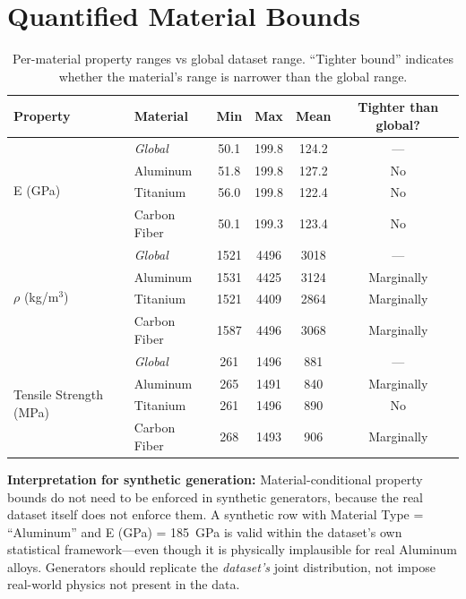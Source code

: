 \documentclass[11pt, a4paper]{report}
\begin{document}
\section{Quantified Material Bounds}

\begin{table}[H]
\centering
\caption{Per-material property ranges vs global dataset range. ``Tighter bound'' indicates whether the material's range is narrower than the global range.}
\label{tab:material_bounds}
\footnotesize
\begin{tabular}{llcccc}
\toprule
\textbf{Property} & \textbf{Material} & \textbf{Min} & \textbf{Max} & \textbf{Mean} & \textbf{Tighter than global?} \\
\midrule
\multirow{4}{*}{E (GPa)}
  & \textit{Global}  & 50.1 & 199.8 & 124.2 & --- \\
  & Aluminum         & 51.8 & 199.8 & 127.2 & No \\
  & Titanium         & 56.0 & 199.8 & 122.4 & No \\
  & Carbon Fiber     & 50.1 & 199.3 & 123.4 & No \\
\midrule
\multirow{4}{*}{$\rho$ (kg/m$^3$)}
  & \textit{Global}  & 1521 & 4496 & 3018 & --- \\
  & Aluminum         & 1531 & 4425 & 3124 & Marginally \\
  & Titanium         & 1521 & 4409 & 2864 & Marginally \\
  & Carbon Fiber     & 1587 & 4496 & 3068 & Marginally \\
\midrule
\multirow{4}{*}{Tensile Strength (MPa)}
  & \textit{Global}  & 261 & 1496 & 881 & --- \\
  & Aluminum         & 265 & 1491 & 840 & Marginally \\
  & Titanium         & 261 & 1496 & 890 & No \\
  & Carbon Fiber     & 268 & 1493 & 906 & Marginally \\
\bottomrule
\end{tabular}
\end{table}

\begin{insightbox}
\textbf{Interpretation for synthetic generation:} Material-conditional property bounds do not need to be enforced in synthetic generators, because the real dataset itself does not enforce them. A synthetic row with Material Type = ``Aluminum'' and E (GPa) = 185~GPa is valid within the dataset's own statistical framework---even though it is physically implausible for real Aluminum alloys. Generators should replicate the \emph{dataset's} joint distribution, not impose real-world physics not present in the data.
\end{insightbox}
\end{document}
